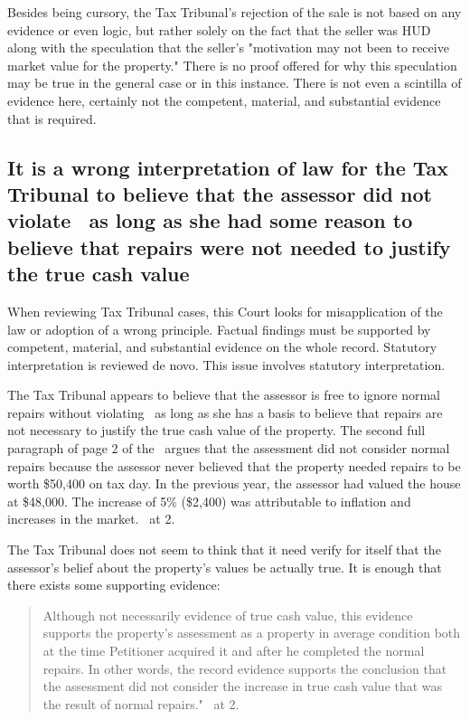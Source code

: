 \documentclass[12pt,\documentclassflag]{michiganCourtOfAppealsBrief}
\def\mathieuGast{\pincite[l]{MCL}{211.27(2)}}
\begin{document}
Besides being cursory, the Tax Tribunal's rejection of the sale is not based on any evidence or even logic, but rather solely on the fact that the seller was HUD along with the speculation that the seller's "motivation may not been to receive market value for the property." There is no proof offered for why this speculation may be true in the general case or in this instance. There is not even a scintilla of evidence here, certainly not the competent, material, and substantial evidence that is required.

\subsection{It is a wrong interpretation of law for the Tax Tribunal to believe that the assessor did not violate \mathieuGast\ as long as she had some reason to believe that repairs were not needed to justify the true cash value}

When reviewing Tax Tribunal cases, this Court looks for misapplication of the law or adoption of a wrong principle. Factual findings must be supported by competent, material, and substantial evidence on the whole record. Statutory interpretation is reviewed de novo.  This issue involves statutory interpretation.

The Tax Tribunal appears to believe that the assessor is free to ignore  normal repairs without violating \mathieuGast\ as long as she has a basis to believe that repairs are not necessary to justify the true cash value of the property. The second full paragraph of page 2 of the \orderDenying\ argues that the assessment did not consider normal repairs because the assessor never believed that the property needed repairs to be worth \$50,400 on tax day. In the previous year, the assessor had valued the house at \$48,000. The increase of 5\% (\$2,400) was attributable to inflation and increases in the market. \orderDenying\ at 2.

The Tax Tribunal does not seem to think that it need verify for itself that the assessor's belief about the property's values be actually true. It is enough that there exists some supporting evidence:

\begin{quote}
	Although not necessarily evidence of true cash value, this evidence supports the property’s assessment as a property in average condition both at the time Petitioner acquired it and after he completed the normal repairs. In other words, the record evidence supports the conclusion that the assessment did not consider the increase in true cash value that was the result of normal repairs." \orderDenying\ at 2. 
\end{quote}
\end{document}
